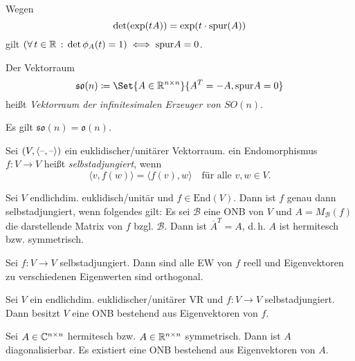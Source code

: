 \documentclass{cheat-sheet}
\newcommand{\End}{\mathrm{End}}
\newcommand{\BB}{\mathcal{B}}
\begin{document}
\begin{bem}
  Wegen
  \[ \det(\exp(tA)) = \exp(t \cdot \mathrm{spur}(A)) \]
  gilt $(\forall \, {t \in \mathbb{R}} \,:\, \det \phi_A(t) = 1) \iff \mathrm{spur} A = 0$.
\end{bem}

\begin{defn}
  Der Vektorraum
  \[ \mathfrak{so}(n) \coloneqq \Set{ A \in \R^{n \times n} }{ A^T = - A, \spur A = 0 } \]
  heißt \emph{Vektorraum der infinitesimalen Erzeuger von $SO(n)$}.
\end{defn}

\begin{satz}
  Es gilt $\mathfrak{so}(n) = \mathfrak{o}(n)$.
\end{satz}



\begin{defn}
  Sei $(V, \langle \text{--} , \text{--} \rangle)$ ein euklidischer/unitärer Vektorraum. ein Endomorphismus $f : V \to V$ heißt \emph{selbstadjungiert}, wenn
  \[ \langle v, f(w) \rangle = \langle f(v), w \rangle \quad \text{für alle $v, w \in V$.} \]
\end{defn}


\begin{satz}
  Sei $V$ endlichdim. euklidisch/unitär und $f \in \End(V)$. Dann ist $f$ genau dann selbstadjungiert, wenn folgendes gilt: Es sei $\BB$ eine ONB von $V$ und $A = M_\BB(f)$ die darstellende Matrix von $f$ bzgl. $\BB$. Dann ist $\overline{A}^T = A$, d.\,h. $A$ ist hermitesch bzw. symmetrisch.
\end{satz}

\begin{satz}
  Sei $f : V \to V$ selbstadjungiert. Dann sind alle EW von $f$ reell und Eigenvektoren zu verschiedenen Eigenwerten sind orthogonal.
\end{satz}

\begin{satz}
  Sei $V$ ein endlichdim. euklidischer/unitärer VR und $f : V \to V$ selbstadjungiert. Dann besitzt $V$ eine ONB bestehend aus Eigenvektoren von $f$.
\end{satz}

\begin{kor}
  Sei $A \in \mathbb{C}^{n \times n}$ hermitesch bzw. $A \in \mathbb{R}^{n \times n}$ symmetrisch. Dann ist $A$ diagonalisierbar. Es existiert eine ONB bestehend aus Eigenvektoren von $A$.
\end{kor}
\end{document}
